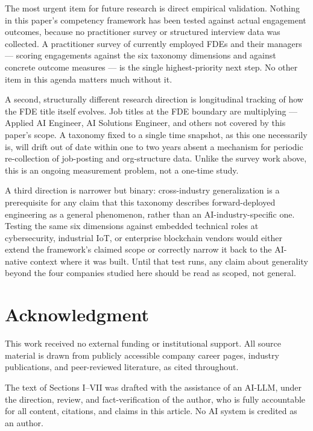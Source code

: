 \documentclass[journal]{IEEEtran}
\begin{document}
The most urgent item for future research is direct empirical validation. Nothing in this paper's competency framework has been tested against actual engagement outcomes, because no practitioner survey or structured interview data was collected. A practitioner survey of currently employed FDEs and their managers --- scoring engagements against the six taxonomy dimensions and against concrete outcome measures --- is the single highest-priority next step. No other item in this agenda matters much without it.

A second, structurally different research direction is longitudinal tracking of how the FDE title itself evolves. Job titles at the FDE boundary are multiplying --- Applied AI Engineer, AI Solutions Engineer, and others not covered by this paper's scope. A taxonomy fixed to a single time snapshot, as this one necessarily is, will drift out of date within one to two years absent a mechanism for periodic re-collection of job-posting and org-structure data. Unlike the survey work above, this is an ongoing measurement problem, not a one-time study.

A third direction is narrower but binary: cross-industry generalization is a prerequisite for any claim that this taxonomy describes forward-deployed engineering as a general phenomenon, rather than an AI-industry-specific one. Testing the same six dimensions against embedded technical roles at cybersecurity, industrial IoT, or enterprise blockchain vendors would either extend the framework's claimed scope or correctly narrow it back to the AI-native context where it was built. Until that test runs, any claim about generality beyond the four companies studied here should be read as scoped, not general.

\section*{Acknowledgment}
This work received no external funding or institutional support. All source material is drawn from publicly accessible company career pages, industry publications, and peer-reviewed literature, as cited throughout.

The text of Sections I--VII was drafted with the assistance of an AI-LLM, under the direction, review, and fact-verification of the author, who is fully accountable for all content, citations, and claims in this article. No AI system is credited as an author.



\end{document}
